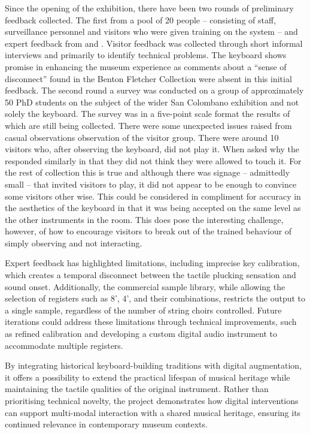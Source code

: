 Since the opening of the exhibition, there have been two rounds of preliminary feedback collected. The first from a pool of 20 people -- consisting of staff, surveillance personnel and visitors who were given training on the system -- and expert feedback from  and .
Visitor feedback was collected through short informal interviews and primarily to identify technical problems.
The keyboard shows promise in enhancing the museum experience as comments about a ``sense of disconnect'' found in the Benton Fletcher Collection \cite{mcalpine_sampling_2014} were absent in this initial feedback.
The second round a survey was conducted on a group of approximately 50 PhD students on the subject of the wider San Colombano exhibition and not solely the keyboard. The survey was in a five-point scale format the results of which are still being collected. 
There were some unexpected issues raised from casual observations observation of the visitor group.
There were around 10 visitors who, after observing the keyboard, did not play it. When asked why the responded similarly in that they did not think they were allowed to touch it. For the rest of collection this is true and although there was signage -- admittedly small -- that invited visitors to play, it did not appear to be enough to convince some visitors other wise. This could be considered in compliment for accuracy in the aesthetics of the keyboard in that it was being accepted on the same level as the other instruments in the room. This does pose the interesting challenge, however, of how to encourage visitors to break out of the trained behaviour of simply observing and not interacting. 

Expert feedback has highlighted limitations, including imprecise key calibration, which creates a temporal disconnect between the tactile plucking sensation and sound onset. Additionally, the commercial sample library, while allowing the selection of registers such as 8', 4', and their combinations, restricts the output to a single sample, regardless of the number of string choirs controlled. Future iterations could address these limitations through technical improvements, such as refined calibration and developing a custom digital audio instrument to accommodate multiple registers.

By integrating historical keyboard-building traditions with digital augmentation, it offers a possibility to extend the practical lifespan of musical heritage while maintaining the tactile qualities of the original instrument. Rather than prioritising technical novelty, the project demonstrates how digital interventions can support multi-modal interaction with a shared musical heritage, ensuring its continued relevance in contemporary museum contexts.
